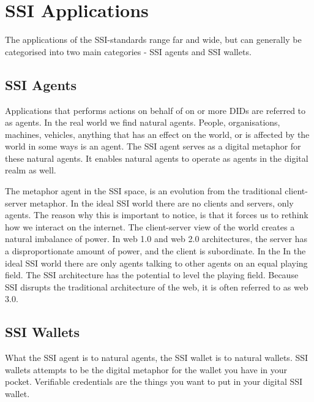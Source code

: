 
\hypertarget{ssi-applications}{%
\section{SSI Applications}\label{ssi-applications}}

The applications of the SSI-standards range far and wide, but can
generally be categorised into two main categories - SSI agents and SSI
wallets.

\hypertarget{ssi-agents}{%
\subsection{SSI Agents}\label{ssi-agents}}

Applications that performs actions on behalf of on or more DIDs are
referred to as agents. In the real world we find natural agents. People,
organisations, machines, vehicles, anything that has an effect on the
world, or is affected by the world in some ways is an agent. The SSI
agent serves as a digital metaphor for these natural agents. It enables
natural agents to operate as agents in the digital realm as well.

The metaphor agent in the SSI space, is an evolution from the
traditional client-server metaphor. In the ideal SSI world there are no
clients and servers, only agents. The reason why this is important to
notice, is that it forces us to rethink how we interact on the internet.
The client-server view of the world creates a natural imbalance of
power. In web 1.0 and web 2.0 architectures, the server has a
disproportionate amount of power, and the client is subordinate. In the
In the ideal SSI world there are only agents talking to other agents on
an equal playing field. The SSI architecture has the potential to level
the playing field. Because SSI disrupts the traditional architecture of
the web, it is often referred to as web 3.0.

\hypertarget{ssi-wallets}{%
\subsection{SSI Wallets}\label{ssi-wallets}}

What the SSI agent is to natural agents, the SSI wallet is to natural
wallets. SSI wallets attempts to be the digital metaphor for the wallet
you have in your pocket. Verifiable credentials are the things you want
to put in your digital SSI wallet.


